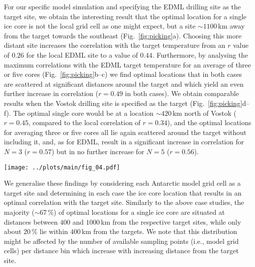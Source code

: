 \documentclass[cp, manuscript]{copernicus}
\begin{document}
For our specific model simulation and specifying the EDML drilling site as the
target site, we obtain the interesting result that the optimal location for a
single ice core is not the local grid cell as one might expect, but a site
$\sim1100$\,km away from the target towards the southeast
(Fig.~\ref{fig:picking}a). Choosing this more distant site increases the
correlation with the target temperature from an $r$ value of $0.26$ for the
local EDML site to a value of $0.44$. Furthermore, by analysing the maximum
correlations with the EDML target temperature for an average of three or five
cores (Fig.~\ref{fig:picking}b--c) we find optimal locations that in both cases
are scattered at significant distances around the target and which yield an even
further increase in correlation ($r=0.49$ in both cases). We obtain comparable
results when the Vostok drilling site is specified as the target
(Fig.~\ref{fig:picking}d--f). The optimal single core would be at a location
$\sim420$\,km north of Vostok ($r=0.45$, compared to the local correlation of
$r=0.34$), and the optimal locations for averaging three or five cores all lie
again scattered around the target without including it, and, as for EDML, result
in a significant increase in correlation for $N=3$ ($r=0.57$) but in no further
increase for $N=5$ ($r=0.56$).

\begin{figure*}[t]%
\centering
\texttt{[image: ../plots/main/fig\_04.pdf]}
\caption[Picking optimal sites]{%
  Choosing ice-core locations that optimally reconstruct interannual
  temperatures at the EDML and Vostok drilling sites. The maps show the
  correlation coefficient in the climate model data between the annual
  temperature time series at the target sites (black crosses) EDML
  (\textbf{a}--\textbf{c}) and Vostok (\textbf{d}--\textbf{f}) with the time
  series fields of precipitation-weighted oxygen isotope composition. Filled
  black circles denote grid cells that maximise the correlation between the
  target site temperature and either a single grid cell ($N=1$; \textbf{a},
  \textbf{d}) or for an average across $N=3$ (\textbf{b}, \textbf{e}) or $N=5$
  (\textbf{c}, \textbf{f}) grid cells.}
\label{fig:picking}%
\end{figure*}%

We generalise these findings by considering each Antarctic model grid cell as a
target site and determining in each case the ice core location that results in
an optimal correlation with the target site. Similarly to the above case
studies, the majority ($\sim67$\,\%) of optimal locations for a single ice core
are situated at distances between $400$ and $1000$\,km from the respective
target sites, while only about $20$\,\% lie within $400$\,km from the
targets. We note that this distribution might be affected by the number of
available sampling points (i.e., model grid cells) per distance bin which
increase with increasing distance from the target site.
\end{document}
